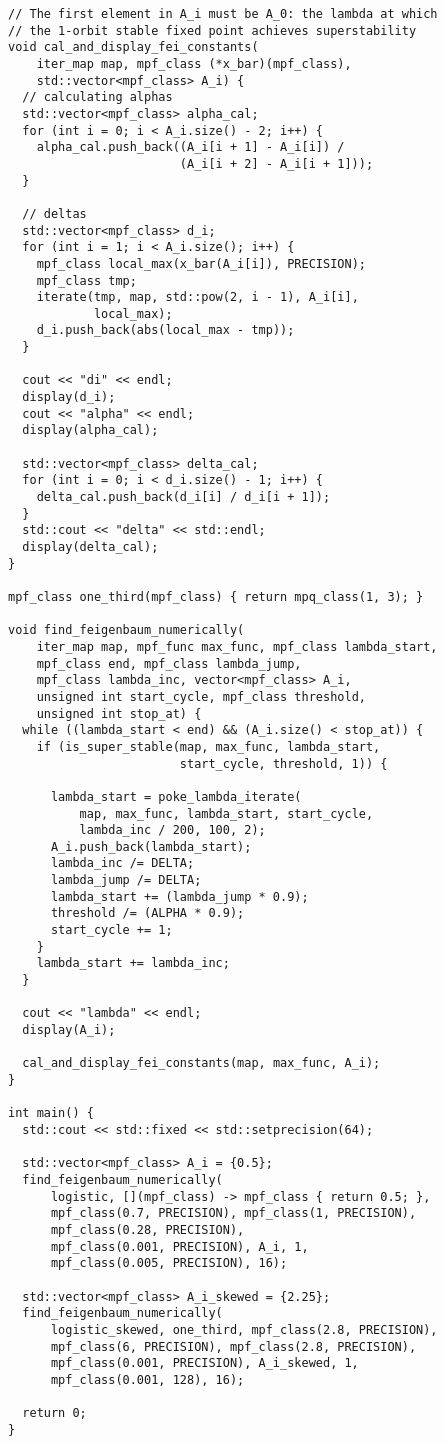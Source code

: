 \begin{lstlisting}[style=cppstyle]
// The first element in A_i must be A_0: the lambda at which
// the 1-orbit stable fixed point achieves superstability
void cal_and_display_fei_constants(
    iter_map map, mpf_class (*x_bar)(mpf_class),
    std::vector<mpf_class> A_i) {
  // calculating alphas
  std::vector<mpf_class> alpha_cal;
  for (int i = 0; i < A_i.size() - 2; i++) {
    alpha_cal.push_back((A_i[i + 1] - A_i[i]) /
                        (A_i[i + 2] - A_i[i + 1]));
  }

  // deltas
  std::vector<mpf_class> d_i;
  for (int i = 1; i < A_i.size(); i++) {
    mpf_class local_max(x_bar(A_i[i]), PRECISION);
    mpf_class tmp;
    iterate(tmp, map, std::pow(2, i - 1), A_i[i],
            local_max);
    d_i.push_back(abs(local_max - tmp));
  }

  cout << "di" << endl;
  display(d_i);
  cout << "alpha" << endl;
  display(alpha_cal);

  std::vector<mpf_class> delta_cal;
  for (int i = 0; i < d_i.size() - 1; i++) {
    delta_cal.push_back(d_i[i] / d_i[i + 1]);
  }
  std::cout << "delta" << std::endl;
  display(delta_cal);
}

mpf_class one_third(mpf_class) { return mpq_class(1, 3); }

void find_feigenbaum_numerically(
    iter_map map, mpf_func max_func, mpf_class lambda_start,
    mpf_class end, mpf_class lambda_jump,
    mpf_class lambda_inc, vector<mpf_class> A_i,
    unsigned int start_cycle, mpf_class threshold,
    unsigned int stop_at) {
  while ((lambda_start < end) && (A_i.size() < stop_at)) {
    if (is_super_stable(map, max_func, lambda_start,
                        start_cycle, threshold, 1)) {

      lambda_start = poke_lambda_iterate(
          map, max_func, lambda_start, start_cycle,
          lambda_inc / 200, 100, 2);
      A_i.push_back(lambda_start);
      lambda_inc /= DELTA;
      lambda_jump /= DELTA;
      lambda_start += (lambda_jump * 0.9);
      threshold /= (ALPHA * 0.9);
      start_cycle += 1;
    }
    lambda_start += lambda_inc;
  }

  cout << "lambda" << endl;
  display(A_i);

  cal_and_display_fei_constants(map, max_func, A_i);
}

int main() {
  std::cout << std::fixed << std::setprecision(64);

  std::vector<mpf_class> A_i = {0.5};
  find_feigenbaum_numerically(
      logistic, [](mpf_class) -> mpf_class { return 0.5; },
      mpf_class(0.7, PRECISION), mpf_class(1, PRECISION),
      mpf_class(0.28, PRECISION),
      mpf_class(0.001, PRECISION), A_i, 1,
      mpf_class(0.005, PRECISION), 16);

  std::vector<mpf_class> A_i_skewed = {2.25};
  find_feigenbaum_numerically(
      logistic_skewed, one_third, mpf_class(2.8, PRECISION),
      mpf_class(6, PRECISION), mpf_class(2.8, PRECISION),
      mpf_class(0.001, PRECISION), A_i_skewed, 1,
      mpf_class(0.001, 128), 16);

  return 0;
}

\end{lstlisting}


